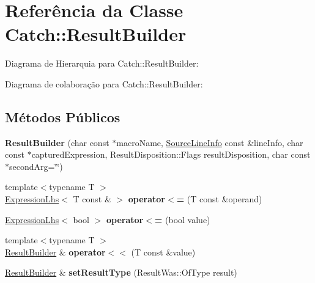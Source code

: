 \hypertarget{classCatch_1_1ResultBuilder}{}\section{Referência da Classe Catch\+:\+:Result\+Builder}
\label{classCatch_1_1ResultBuilder}


Diagrama de Hierarquia para Catch\+:\+:Result\+Builder\+:


Diagrama de colaboração para Catch\+:\+:Result\+Builder\+:
\subsection*{Métodos Públicos}
\begin{DoxyCompactItemize}
\item 
{\bfseries Result\+Builder} (char const $\ast$macro\+Name, \hyperlink{structCatch_1_1SourceLineInfo}{Source\+Line\+Info} const \&line\+Info, char const $\ast$captured\+Expression, Result\+Disposition\+::\+Flags result\+Disposition, char const $\ast$second\+Arg=\char`\"{}\char`\"{})\hypertarget{classCatch_1_1ResultBuilder_a8579c3056f64f9324cf1181532828376}{}\label{classCatch_1_1ResultBuilder_a8579c3056f64f9324cf1181532828376}

\item 
{\footnotesize template$<$typename T $>$ }\\\hyperlink{classCatch_1_1ExpressionLhs}{Expression\+Lhs}$<$ T const \& $>$ {\bfseries operator$<$=} (T const \&operand)\hypertarget{classCatch_1_1ResultBuilder_a1829db87e701758c4c520988883b25b5}{}\label{classCatch_1_1ResultBuilder_a1829db87e701758c4c520988883b25b5}

\item 
\hyperlink{classCatch_1_1ExpressionLhs}{Expression\+Lhs}$<$ bool $>$ {\bfseries operator$<$=} (bool value)\hypertarget{classCatch_1_1ResultBuilder_a3b87b20bcd1ef9e630880e59eeefba2a}{}\label{classCatch_1_1ResultBuilder_a3b87b20bcd1ef9e630880e59eeefba2a}

\item 
{\footnotesize template$<$typename T $>$ }\\\hyperlink{classCatch_1_1ResultBuilder}{Result\+Builder} \& {\bfseries operator$<$$<$} (T const \&value)\hypertarget{classCatch_1_1ResultBuilder_a5aa79ce6160ab8cd800eb65bbd7a28a4}{}\label{classCatch_1_1ResultBuilder_a5aa79ce6160ab8cd800eb65bbd7a28a4}

\item 
\hyperlink{classCatch_1_1ResultBuilder}{Result\+Builder} \& {\bfseries set\+Result\+Type} (Result\+Was\+::\+Of\+Type result)\hypertarget{classCatch_1_1ResultBuilder_af896e372db9d7fc90ddeceff3ad110d0}{}\label{classCatch_1_1ResultBuilder_af896e372db9d7fc90ddeceff3ad110d0}


\end{DoxyCompactItemize}
